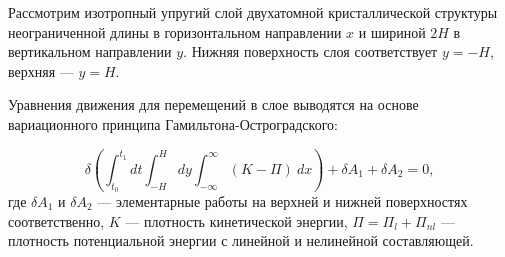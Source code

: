 
Рассмотрим изотропный упругий слой двухатомной кристаллической структуры неограниченной длины в горизонтальном направлении $x$ и шириной $2 H$ в вертикальном направлении $y$. Нижняя поверхность слоя соответствует $y = -H$, верхняя --- $y = H$.



Уравнения движения для перемещений в слое выводятся на основе вариационного принципа Гамильтона-Остроградского:

\begin{equation}
	\delta \left( \int_{t_0}^{t_1}dt \int_{-H}^{H} dy \int_{-\infty}^{\infty}\left( K - \Pi \right)  \:   dx \right)+ \delta A_1 + \delta A_2=0, \label{var}
\end{equation}
где $\delta A_1$ и $\delta A_2$ --- элементарные работы на верхней и нижней поверхностях соответственно, $K$ --- плотность кинетической энергии, $\Pi = \Pi_{l} + \Pi_{nl}$ --- плотность потенциальной энергии с линейной и нелинейной составляющей.


